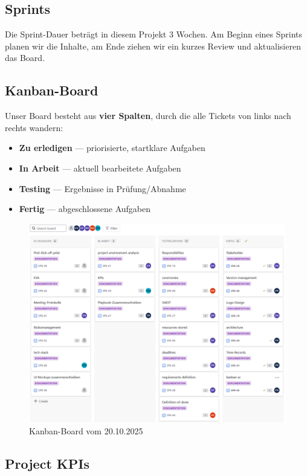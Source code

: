 \documentclass{article}
\begin{document}
\subsection{Sprints}
Die Sprint-Dauer beträgt in diesem Projekt 3 Wochen. Am Beginn eines Sprints planen wir die Inhalte, am Ende ziehen wir ein kurzes Review und aktualisieren das Board.

\subsection{Kanban-Board}
Unser Board besteht aus \textbf{vier Spalten}, durch die alle Tickets von links nach rechts wandern:
\begin{itemize}[nosep]
  \item \textbf{Zu erledigen} — priorisierte, startklare Aufgaben
  \item \textbf{In Arbeit} — aktuell bearbeitete Aufgaben
  \item \textbf{Testing} — Ergebnisse in Prüfung/Abnahme
  \item \textbf{Fertig} — abgeschlossene Aufgaben
\end{itemize}


\begin{figure}[H]
  \centering
  \includegraphics[width=\textwidth]{kanban_board.png}
  \caption{Kanban-Board vom 20.10.2025}
  \label{fig:kanban-board}
\end{figure}


\subsection{Project KPIs}
\end{document}
